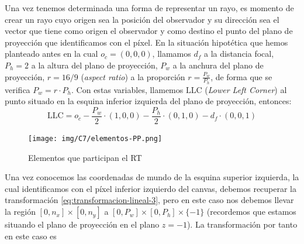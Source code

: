 Una vez tenemos determinada una forma de representar un rayo, es momento de crear un rayo cuyo origen sea la posición del observador y su dirección sea el vector que tiene como origen el observador y como destino el punto del plano de proyección que identificamos con el píxel. En la situación hipotética que hemos planteado antes en la cual $o_c=(0,0,0)$, llamamos $d_f$ a la distancia focal, $P_h=2$ a la altura del plano de proyección, $P_w$ a la anchura del plano de proyección, $r = 16/9$ (\textit{aspect ratio}) a la proporción $r = \frac{P_w}{P_h}$, de forma que se verifica $P_w=r\cdot P_h$. Con estas variables, llamemos $\mathrm{LLC}$ (\textit{Lower Left Corner}) al punto situado en la esquina inferior izquierda del plano de proyección, entonces:
\begin{equation}
    \label{eq:LLC-inicial}
    \mathrm{LLC} = o_c - \frac{P_w}{2}\cdot(1,0,0) - \frac{P_h}{2}\cdot(0,1,0) - d_f \cdot (0,0,1)
\end{equation}

\begin{figure} [ht]
    \centering
    \texttt{[image: img/C7/elementos-PP.png]}
    \caption{Elementos que participan el RT}
    \label{fig:elementos}
\end{figure}

Una vez conocemos las coordenadas de mundo de la esquina superior izquierda, la cual identificamos con el píxel inferior izquierdo del canvas, debemos recuperar la transformación \ref{eq:transformacion-lineal-3}, pero en este caso nos debemos llevar la región $[0,n_x]\times[0,n_y]$ a $[0,P_w]\times[0,P_h]\times\{-1\}$ (recordemos que estamos situando el plano de proyección en el plano $z=-1$). La transformación por tanto en este caso es

